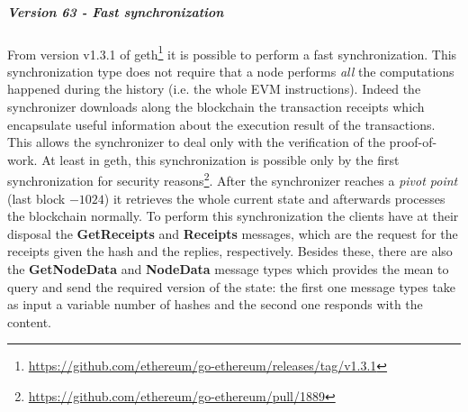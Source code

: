 \subparagraph{Version 63 - Fast synchronization}
From version v1.3.1 of
geth\footnote{\url{https://github.com/ethereum/go-ethereum/releases/tag/v1.3.1}}
it is possible to perform a fast synchronization. This synchronization type does
not require that a node performs \emph{all} the computations happened during the
history (i.e. the whole EVM instructions). Indeed the synchronizer downloads
along the blockchain the transaction receipts which encapsulate useful
information about the execution result of the transactions. This allows the
synchronizer to deal only with the verification of the proof-of-work. At least
in geth, this synchronization is possible only by the first synchronization for
security
reasons\footnote{\url{https://github.com/ethereum/go-ethereum/pull/1889}}. After
the synchronizer reaches a \textit{pivot point} (last block $- 1024$) it
retrieves the whole current state and afterwards processes the blockchain
normally. To perform this synchronization the clients have at their disposal the
\textbf{GetReceipts} and \textbf{Receipts} messages, which are the request for
the receipts given the hash and the replies, respectively. Besides these, there
are also the \textbf{GetNodeData} and \textbf{NodeData} message types which
provides the mean to query and send the required version of the state: the first
one message types take as input a variable number of hashes and the second one
responds with the content.